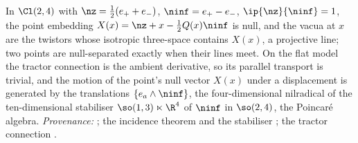 In $\Cl(2,4)$ with $\nz = \tfrac12(e_{+} + e_{-})$, $\ninf = e_{+} - e_{-}$, $\ip{\nz}{\ninf} = 1$, the point embedding $X(x) = \nz + x - \tfrac12 Q(x)\ninf$ is null, and the vacua at $x$ are the twistors whose isotropic three-space contains $X(x)$, a projective line; two points are null-separated exactly when their lines meet. On the flat model the tractor connection is the ambient derivative, so its parallel transport is trivial, and the motion of the point's null vector $X(x)$ under a displacement is generated by the translations $\{e_a \wedge \ninf\}$, the four-dimensional nilradical of the ten-dimensional stabiliser $\so(1,3) \ltimes \R^{4}$ of $\ninf$ in $\so(2,4)$, the Poincar\'e algebra. \emph{Provenance:} \cite[Fact~2.3, Prop.~4.1(2)]{ButlerT16}; the incidence theorem and the stabiliser \cite[Thm.~4.2, Fact~4.3]{ButlerT9}; the tractor connection \cite{BEG1994}.
